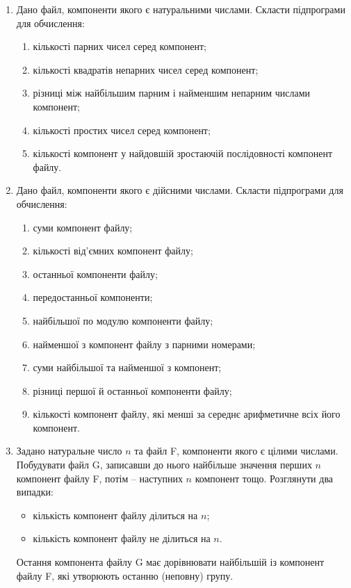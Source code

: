 \documentclass[a5paper,titlepage,openany,twoside,
]
{book_unv}%
\makeatletter
\newcommand{\xslalph}[1]{\expandafter\@xslalph\csname c@#1\endcsname}
\newcommand{\@xslalph}[1]{%
    \ifcase#1\or а\or б\or в\or г\or д\or e\or є\or ж\or з\or i%
    \or й\or к\or л\or м\or н\or о\or п\or р\or с\or т%
    \or у\or ф\or х\or ц\or ч\or ш\or ю\or я\or аа\or бб\or вв%
    \else\@ctrerr\fi%
}
\makeatother
\begin{document}
\begin{enumerate}
\def\labelenumi{\arabic{enumi})}
\setcounter{enumi}{5}
\item
  Дано файл, компоненти якого є натуральними числами. Скласти
  підпрограми для обчислення:
\begin{enumerate}[label=\xslalph*)]
\item
кількості парних чисел серед компонент;
\item
кількості квадратів непарних чисел серед компонент;
\item
різниці між найбільшим парним і найменшим непарним числами компонент;
\item
кількості простих чисел серед компонент;
\item  
кількості компонент у найдовшій зростаючій послідовності компонент
файлу.
\end{enumerate}

\item
  Дано файл, компоненти якого є дійсними числами. Скласти підпрограми
  для обчислення:
\begin{enumerate}[label=\xslalph*)]
\item
суми компонент файлу;
\item
кількості від'ємних компонент файлу;
\item
останньої компоненти файлу;
\item
передостанньої компоненти;
\item 
найбільшої по модулю компоненти файлу;
\item
найменшої з компонент файлу з парними номерами;
\item 
суми найбільшої та найменшої з компонент;
\item
різниці першої й останньої компоненти файлу;
\item
кількості компонент файлу, які менші за середнє арифметичне всіх його
компонент.
\end{enumerate}


\item
  Задано натуральне число $n$ та файл F, компоненти якого є цілими
  числами. Побудувати файл G, записавши до нього найбільше значення
  перших $n$ компонент файлу F, потім -- наступних $n$ компонент тощо.
  Розглянути два випадки:
\begin{itemize}
\item
кількість компонент файлу ділиться на $n$;
\item
кількість компонент файлу не ділиться на $n$. 
\end{itemize}
Остання компонента файлу G має дорівнювати найбільшій із компонент 
файлу F, які утворюють останню (неповну) групу.


\end{enumerate}
\end{document}
